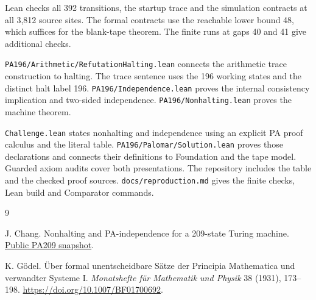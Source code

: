 \documentclass[11pt,letterpaper]{article}
\newcommand{\file}[1]{\texttt{\nolinkurl{#1}}}
\begin{document}
Lean checks all 392 transitions, the startup trace and the
simulation contracts at all 3,812 source sites.
The formal contracts use the reachable lower bound 48, which
suffices for the blank-tape theorem. The finite runs at gaps 40 and
41 give additional checks.

\file{PA196/Arithmetic/RefutationHalting.lean} connects the arithmetic
trace construction to halting. The trace sentence uses the 196
working states and the distinct halt label 196.
\file{PA196/Independence.lean} proves the internal consistency
implication and two-sided independence. \file{PA196/Nonhalting.lean}
proves the machine theorem.

\file{Challenge.lean} states nonhalting and independence using an
explicit PA proof calculus and the literal table.
\file{PA196/Palomar/Solution.lean} proves those declarations and
connects their definitions to Foundation and the tape model. Guarded
axiom audits cover both presentations. The repository includes the
table and the checked proof sources. \file{docs/reproduction.md}
gives the finite checks, Lean build and Comparator commands.

\begin{thebibliography}{9}

J. Chang.
Nonhalting and PA-independence for a 209-state Turing machine.
\href{https://github.com/jamesyc/BusyBeaver/tree/69d98241a721ead20b4f0b17df9062950b40fbfe}{Public PA209 snapshot}.

K. G\"odel.
\"Uber formal unentscheidbare S\"atze der Principia Mathematica und
verwandter Systeme I.
\emph{Monatshefte f\"ur Mathematik und Physik} 38 (1931), 173--198.
\url{https://doi.org/10.1007/BF01700692}.

\end{thebibliography}
\end{document}
